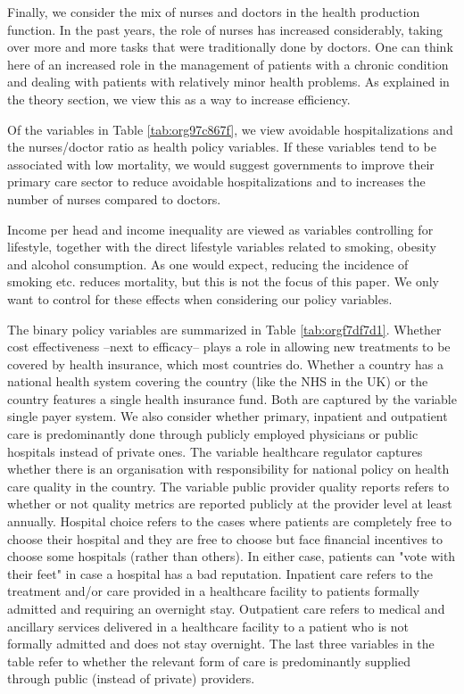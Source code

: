\documentclass{article}
\begin{document}
Finally, we consider the mix of nurses and doctors in the health production function. In the past years, the role of nurses has increased considerably, taking over more and more tasks that were traditionally done by doctors. One can think here of an increased role in the management of patients with a chronic condition and dealing with patients with relatively minor health problems. As explained in the theory section, we view this as a way to increase efficiency.

Of the variables in Table \ref{tab:org97c867f}, we view avoidable hospitalizations and the nurses/doctor ratio as health policy variables. If these variables tend to be associated with low mortality, we would suggest governments to improve their primary care sector to reduce avoidable hospitalizations and to increases the number of nurses compared to doctors.

Income per head and income inequality are viewed as variables controlling for lifestyle, together with the direct lifestyle variables related to smoking, obesity and alcohol consumption. As one would expect, reducing the incidence of smoking etc. reduces mortality, but this is not the focus of this paper. We only want to control for these effects when considering our policy variables.

The binary policy variables are summarized in Table \ref{tab:orgf7df7d1}. Whether cost effectiveness --next to efficacy-- plays a role in allowing new treatments to be covered by health insurance, which most countries do. Whether a country has a national health system covering the country (like the NHS in the UK) or the country features a single health insurance fund. Both are captured by the variable single payer system. We also consider whether primary, inpatient and outpatient care is predominantly done through publicly employed physicians or public hospitals instead of private ones. The variable healthcare regulator captures whether there is an organisation with responsibility for national policy on health care quality in the country. The variable public provider quality reports refers to whether or not quality metrics are reported publicly at the provider level at least annually. Hospital choice refers to the cases where patients are completely free to choose their hospital and they are free to choose but face financial incentives to choose some hospitals (rather than others). In either case, patients can "vote with their feet" in case a hospital has a bad reputation. Inpatient care refers to the treatment and/or care provided in a healthcare facility to patients formally admitted and requiring an overnight stay. Outpatient care refers to medical and ancillary services delivered in a healthcare facility to a patient who is not formally admitted and does not stay overnight. The last three variables in the table refer to whether the relevant form of care is predominantly supplied through public (instead of private) providers.
\end{document}
